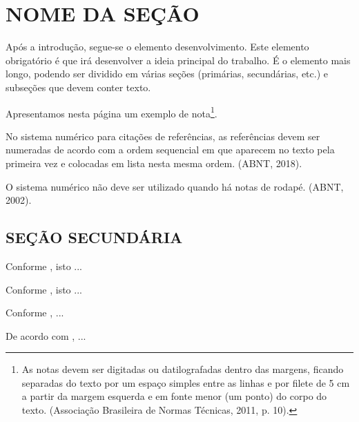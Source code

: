 \documentclass[
  oneside, %
  english,
  brazil
]{abntbibufjf}
\begin{document}
\chapter{NOME DA SEÇÃO}

Após a introdução, segue-se o elemento desenvolvimento.
Este elemento obrigatório é que irá desenvolver a ideia principal do trabalho.
É o elemento mais longo, podendo ser dividido em várias seções (primárias, secundárias, etc.) e subseções que devem conter texto.

Apresentamos nesta página um exemplo de nota\footnote{\noindent
  As notas devem ser digitadas ou datilografadas dentro das margens, ficando separadas do texto por um espaço simples entre as linhas e por filete de 5 cm a partir da margem esquerda e em fonte menor (um ponto) do corpo do texto.
  (Associação Brasileira de Normas Técnicas, 2011, p. 10).
}.

No sistema numérico para citações de referências, as referências devem ser numeradas de acordo com a ordem sequencial em que aparecem no texto pela primeira vez e colocadas em lista nesta mesma ordem. (ABNT, 2018).

O sistema numérico não deve ser utilizado quando há notas de rodapé. (ABNT, 2002).


\section{SEÇÃO SECUNDÁRIA}





Conforme \cite[p. 4]{aguiar2019_ad}, isto ...

Conforme , isto ...

Conforme \cite{bauman1999_ad}, ...

De acordo com , ...
\end{document}
